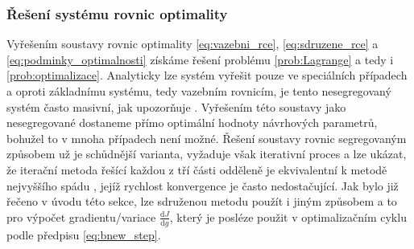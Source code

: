\subsubsection{Řešení systému rovnic optimality}
Vyřešením soustavy rovnic optimality \ref{eq:vazebni_rce}, \ref{eq:sdruzene_rce} a \ref{eq:podminky_optimalnosti} získáme řešení problému \ref{prob:Lagrange} a tedy i \ref{prob:optimalizace}. Analyticky lze systém vyřešit pouze ve speciálních případech a oproti základnímu systému, tedy vazebním rovnicím, je tento nesegregovaný systém často masivní, jak upozorňuje \cite{karman1997inverse}. Vyřešením této soustavy jako nesegregované dostaneme přímo optimální hodnoty návrhových parametrů, bohužel to v mnoha případech není možné. Řešení soustavy rovnic segregovaným způsobem už je schůdnější varianta, vyžaduje však iterativní proces a lze ukázat, že iterační metoda řešící každou z tří části odděleně je ekvivalentní k metodě nejvyššího spádu \cite{karman1997inverse}, jejíž rychlost konvergence je často nedostačující. Jak bylo již řečeno v úvodu této sekce, lze sdruženou metodu použít i jiným způsobem a to pro výpočet gradientu/variace $ \frac{\mathrm{d} J}{\mathrm{d} g} $, který je posléze použit v optimalizačním cyklu podle předpisu \ref{eq:bnew_step}.

